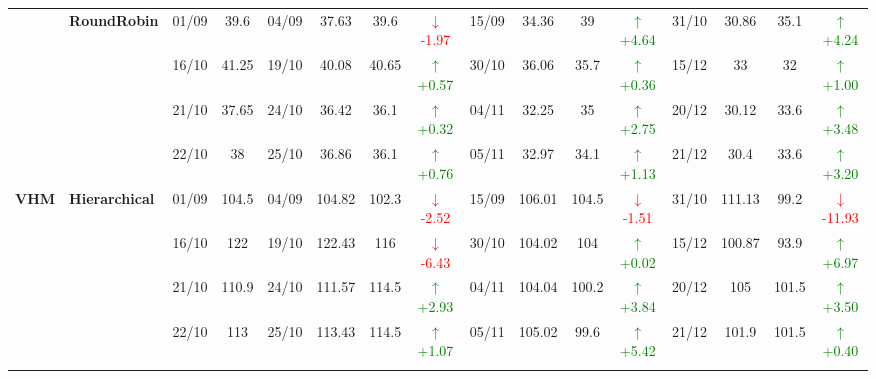 {\begin{longtable}{llcc|cccc|cccc|cccc}
& \textbf{RoundRobin}
& 01/09 & 39.6 & 04/09 & 37.63 & 39.6 & \textcolor{red}{\(\downarrow\)-1.97} & 15/09 & 34.36 & 39 & \textcolor{green}{\(\uparrow\)+4.64} & 31/10 & 30.86 & 35.1 & \textcolor{green}{\(\uparrow\)+4.24} \\

&
& 16/10 & 41.25 & 19/10 & 40.08 & 40.65 & \textcolor{green}{\(\uparrow\)+0.57} & 30/10 & 36.06 & 35.7 & \textcolor{green}{\(\uparrow\)+0.36} & 15/12 & 33 & 32 & \textcolor{green}{\(\uparrow\)+1.00} \\

&
& 21/10 & 37.65 & 24/10 & 36.42 & 36.1 & \textcolor{green}{\(\uparrow\)+0.32} & 04/11 & 32.25 & 35 & \textcolor{green}{\(\uparrow\)+2.75} & 20/12 & 30.12 & 33.6 & \textcolor{green}{\(\uparrow\)+3.48} \\

&
& 22/10 & 38 & 25/10 & 36.86 & 36.1 & \textcolor{green}{\(\uparrow\)+0.76} & 05/11 & 32.97 & 34.1 & \textcolor{green}{\(\uparrow\)+1.13} & 21/12 & 30.4 & 33.6 & \textcolor{green}{\(\uparrow\)+3.20} \\
\midrule




\multirow{12}{*}{\textbf{VHM}} 
& \textbf{Hierarchical}
& 01/09 & 104.5 & 04/09 & 104.82 & 102.3 & \textcolor{red}{\(\downarrow\)-2.52} & 15/09 & 106.01 & 104.5 & \textcolor{red}{\(\downarrow\)-1.51} & 31/10 & 111.13 & 99.2 & \textcolor{red}{\(\downarrow\)-11.93} \\

&
& 16/10 & 122 & 19/10 & 122.43 & 116 & \textcolor{red}{\(\downarrow\)-6.43} & 30/10 & 104.02 & 104 & \textcolor{green}{\(\uparrow\)+0.02} & 15/12 & 100.87 & 93.9 & \textcolor{green}{\(\uparrow\)+6.97} \\

&
& 21/10 & 110.9 & 24/10 & 111.57 & 114.5 & \textcolor{green}{\(\uparrow\)+2.93} & 04/11 & 104.04 & 100.2 & \textcolor{green}{\(\uparrow\)+3.84} & 20/12 & 105 & 101.5 & \textcolor{green}{\(\uparrow\)+3.50} \\

&
& 22/10 & 113 & 25/10 & 113.43 & 114.5 & \textcolor{green}{\(\uparrow\)+1.07} & 05/11 & 105.02 & 99.6 & \textcolor{green}{\(\uparrow\)+5.42} & 21/12 & 101.9 & 101.5 & \textcolor{green}{\(\uparrow\)+0.40} \\
\cmidrule(lr){2-16}



\end{longtable}}
